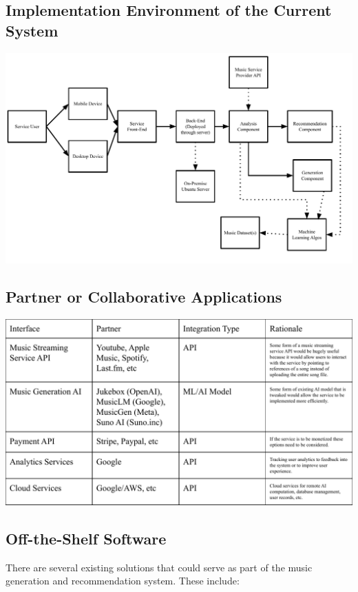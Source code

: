 \documentclass[12pt]{article}
\begin{document}
\subsection{Implementation Environment of the Current System}
\includegraphics[scale=0.552]{3_2_environment_diagram.pdf}

\subsection{Partner or Collaborative Applications}
\includegraphics[scale=0.72]{3_3_partner_constraints_figure}

\subsection{Off-the-Shelf Software}
There are several existing solutions that could serve as part of the music generation and recommendation system. These include:
\end{document}
